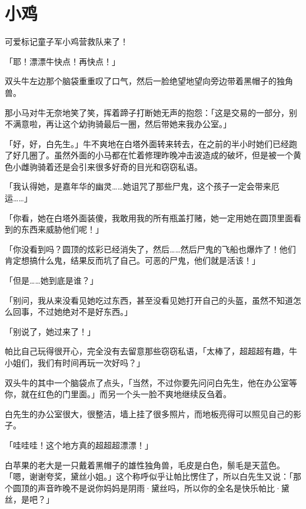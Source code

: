 \chapter{小鸡}


\begin{intro}
可爱标记童子军小鸡营救队来了！
\end{intro}


「耶！漂漂牛快点！再快点！」

双头牛左边那个脑袋重重叹了口气，然后一脸绝望地望向旁边带着黑帽子的独角兽。

那小马对牛无奈地笑了笑，挥着蹄子打断她无声的抱怨：「这是交易的一部分，别不满意啦，再让这个幼驹骑最后一圈，然后带她来我办公室。」

「好，好，白先生。」牛不爽地在白塔外面转来转去，在之前的半小时她们已经跑了好几圈了。虽然外面的小马都在忙着修理昨晚冲击波造成的破坏，但是被一个黄色小雌驹骑着还是会引来很多好奇的目光和窃窃私语。

「我认得她，是嘉年华的幽灵……她诅咒了那些尸鬼，这个孩子一定会带来厄运……」

「你看，她在白塔外面装傻，我敢用我的所有瓶盖打赌，她一定用她在圆顶里面看到的东西来威胁他们呢！」

「你没看到吗？圆顶的炫彩已经消失了，然后……然后尸鬼的飞船也爆炸了！他们肯定想搞什么鬼，结果反而坑了自己。可恶的尸鬼，他们就是活该！」

「但是……她到底是谁？」

「别问，我从来没看见她吃过东西，甚至没看见她打开自己的头盔，虽然不知道怎么回事，不过她绝对不是好东西。」

「别说了，她过来了！」

帕比自己玩得很开心，完全没有去留意那些窃窃私语，「太棒了，超超超有趣，牛小姐们，我们有时间再玩一次好吗？」

双头牛的其中一个脑袋点了点头，「当然，不过你要先问问白先生，他在办公室等你，就在红色的门里面。」而另一个头一脸不爽地继续反刍着。

白先生的办公室很大，很整洁，墙上挂了很多照片，而地板亮得可以照见自己的影子。

「哇哇哇！这个地方真的超超超漂漂！」

白苹果的老大是一只戴着黑帽子的雄性独角兽，毛皮是白色，鬃毛是天蓝色。「嗯，谢谢夸奖，黛丝小姐。」这个称呼似乎让帕比愣住了，所以白先生又说：「那个圆顶的声音昨晚不是说你妈妈是阴雨·黛丝吗，所以你的全名是快乐帕比·黛丝，是吧？」

